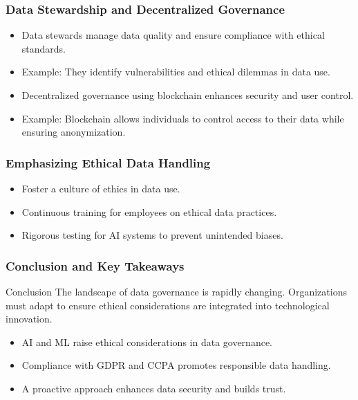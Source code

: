 \documentclass[aspectratio=169]{beamer}
\begin{document}
\begin{frame}[fragile]
    \frametitle{Data Stewardship and Decentralized Governance}
    \begin{itemize}
        \item Data stewards manage data quality and ensure compliance with ethical standards.
        \item Example: They identify vulnerabilities and ethical dilemmas in data use.
        \item Decentralized governance using blockchain enhances security and user control.
        \item Example: Blockchain allows individuals to control access to their data while ensuring anonymization.
    \end{itemize}
\end{frame}

\begin{frame}[fragile]
    \frametitle{Emphasizing Ethical Data Handling}
    \begin{itemize}
        \item Foster a culture of ethics in data use.
        \item Continuous training for employees on ethical data practices.
        \item Rigorous testing for AI systems to prevent unintended biases.
    \end{itemize}
\end{frame}

\begin{frame}[fragile]
    \frametitle{Conclusion and Key Takeaways}
    \begin{block}{Conclusion}
        The landscape of data governance is rapidly changing. Organizations must adapt to ensure ethical considerations are integrated into technological innovation.
    \end{block}
    \begin{itemize}
        \item AI and ML raise ethical considerations in data governance.
        \item Compliance with GDPR and CCPA promotes responsible data handling.
        \item A proactive approach enhances data security and builds trust.
    \end{itemize}
\end{frame}
\end{document}
